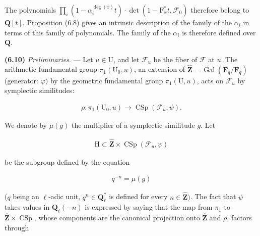 \documentclass[10pt,leqno]{article}
\begin{document}
\noindent The polynomials \(\prod _{i}(1- \alpha _{i}^{\operatorname{deg}(x)}t)\cdot \operatorname{det}(1- \mathrm{F}_{x}^{*}t,\mathcal{F} _{0})\) therefore belong to \(\mathbf{Q}[t]\). Proposition (6.8) gives an intrinsic description of the family of the \(\alpha _{i}\) in terms of this family of polynomials. The family of the \(\alpha _{i}\) is therefore defined over \(\mathbf{Q}\).\par

\noindent \textbf{(6.10)} \emph{Preliminaries}. — Let \(u\in \mathrm{U}\), and let \(\mathcal{F} _{u}\) be the fiber of \(\mathcal{F} \) at \(u\). The arithmetic fundamental group \(\pi _{1}(\mathrm{U}_{0},u)\), an extension of \(\widehat{\mathbf{Z}}=\operatorname{Gal}(\overline{\mathbf{F}}_{q}/\mathbf{F}_{q})\) (generator: \(\varphi )\) by the geometric fundamental group \(\pi _{1}(\mathrm{U},u)\), acts on \(\mathcal{F} _{u}\) by symplectic similitudes:\par

\begin{equation*}\begin{gathered}\rho  : \pi _{1}(\mathrm{U}_{0},u) \longrightarrow  \operatorname{CSp}(\mathcal{F} _{u},\psi ).\end{gathered}\end{equation*}

\clearpage

\label{physical-27}\par\smallskip

\noindent We denote by \(\mu (g)\) the multiplier of a symplectic similitude \(g\). Let\par

\begin{equation*}\begin{gathered}\mathrm{H}\subset \widehat{\mathbf{Z}}\times \operatorname{CSp}(\mathcal{F} _{u},\psi )\end{gathered}\end{equation*}

\noindent be the subgroup defined by the equation\par

\begin{equation*}\begin{gathered}q^{- n}=\mu (g)\end{gathered}\end{equation*}

\noindent (\(q\) being an \(\ell \)-adic unit, \(q^{n}\in \mathbf{Q}_{\ell }^{*}\) is defined for every \(n\in \widehat{\mathbf{Z}})\). The fact that \(\psi \) takes values in \(\mathbf{Q}_{\ell }(- n)\) is expressed by saying that the map from \(\pi _{1}\) to \(\widehat{\mathbf{Z}}\times \operatorname{CSp}\), whose components are the canonical projection onto \(\widehat{\mathbf{Z}}\) and \(\rho \), factors through\par
\end{document}
